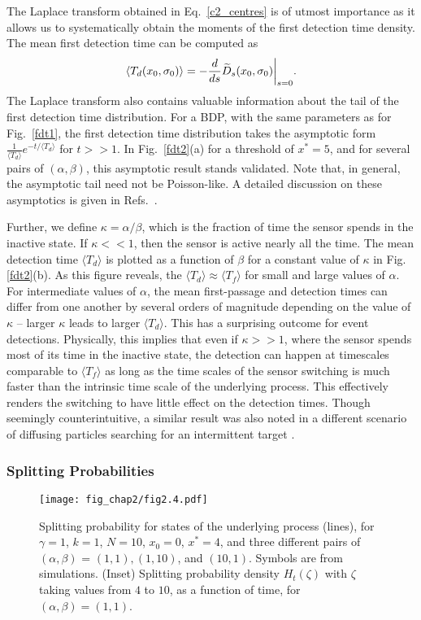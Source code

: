 The Laplace transform obtained in Eq.~\ref{c2_centres} is of utmost importance as it allows us to systematically obtain the moments of the first detection time density. The mean first detection time can be computed as 
\begin{equation}
    \langle T_d(x_0,\sigma_0) \rangle  = -\frac{d}{ds} \widetilde{D}_{s}(x_0,\sigma_0) \bigg{|}_{s=0}.
\end{equation} 
The Laplace transform also contains valuable information about the tail of the first detection time distribution. For a BDP, with the same parameters as for Fig.~\ref{fdt1}, the first detection time distribution takes the asymptotic form $\frac{1}{\langle T_d \rangle} e^{-t/\langle T_d \rangle}$ for $t>>1$. In Fig.~\ref{fdt2}(a) for a threshold of $x^*=5$, and for several pairs of $(\alpha, \beta)$, this asymptotic result stands validated. Note that, in general, the asymptotic tail need not be Poisson-like. A detailed discussion on these asymptotics is given in Refs.~\cite{godec_universal_2016,hartich_duality_2018,hartich_interlacing_2019}.


Further, we define $\kappa = \alpha/\beta$, which is the fraction of time the sensor spends in the inactive state. If $\kappa << 1$, then the sensor is active nearly all the time. The mean detection time $\langle T_d \rangle$ is plotted as a function of $\beta$ for a constant value of $\kappa$ in Fig. \ref{fdt2}(b). As this figure reveals, the $\langle T_d \rangle \approx \langle T_f \rangle$ for small
and large values of $\alpha$. For intermediate values of $\alpha$, the mean first-passage and detection
times can differ from one another by several orders of magnitude depending on the value of $\kappa$ -- larger
$\kappa$ leads to larger $\langle T_d \rangle$. This has a surprising outcome for event detections. Physically, this implies that even if $\kappa >> 1$, where the sensor spends most of its time in the inactive state, the detection can happen at timescales comparable to $\langle T_f \rangle$ as long as the time scales of the sensor switching is much faster than the intrinsic time scale of the underlying process. This effectively renders the switching to have little effect on the detection times. Though seemingly counterintuitive,  a similar result was also noted in a different scenario of diffusing particles searching for an intermittent target \citep{int-target-1}.


\subsubsection{Splitting Probabilities} 
\begin{figure}
\centering
\texttt{[image: fig\_chap2/fig2.4.pdf]}
\caption{Splitting probability for states of the underlying process (lines), for $\gamma=1$, $k=1$, $N=10$, $x_0=0$, $x^*=4$, and three different pairs of $(\alpha,\beta)$ = $(1,1), (1,10)$, and $(10,1)$. Symbols are from simulations. (Inset) Splitting probability density $H_t(\zeta)$ with $\zeta$ taking values from $4$ to $10$, as a function of time, for $(\alpha,\beta)=(1,1)$.}
\label{splitprob}
\end{figure}

